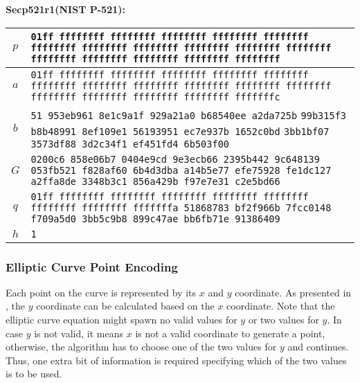 \textbf{Secp521r1(NIST P-521):}
\begin{center}
\begin{tabular}{|c|p{9.8cm}|} \hline
    $p$ &   \texttt{\phantom{0000}01ff ffffffff ffffffff ffffffff ffffffff ffffffff} \newline
            \texttt{ffffffff ffffffff ffffffff ffffffff ffffffff ffffffff} \newline
            \texttt{ffffffff ffffffff ffffffff ffffffff ffffffff} \\ \hline
    $a$ &   \texttt{\phantom{0000}01ff ffffffff ffffffff ffffffff ffffffff ffffffff} \newline
            \texttt{ffffffff ffffffff ffffffff ffffffff ffffffff ffffffff} \newline
            \texttt{ffffffff ffffffff ffffffff ffffffff fffffffc} \\ \hline
    $b$ &   \texttt{\phantom{000000}51 953eb961 8e1c9a1f 929a21a0 b68540ee a2da725b} \newline
            \texttt{99b315f3 b8b48991 8ef109e1 56193951 ec7e937b 1652c0bd} \newline
            \texttt{3bb1bf07 3573df88 3d2c34f1 ef451fd4 6b503f00} \\ \hline
    $G$ &   \texttt{\phantom{00}0200c6 858e06b7 0404e9cd 9e3ecb66 2395b442 9c648139} \newline
            \texttt{053fb521 f828af60 6b4d3dba a14b5e77 efe75928 fe1dc127} \newline
            \texttt{a2ffa8de 3348b3c1 856a429b f97e7e31 c2e5bd66} \\ \hline
    $q$ &   \texttt{\phantom{0000}01ff ffffffff ffffffff ffffffff ffffffff ffffffff} \newline
            \texttt{ffffffff ffffffff fffffffa 51868783 bf2f966b 7fcc0148} \newline
            \texttt{f709a5d0 3bb5c9b8 899c47ae bb6fb71e 91386409} \\ \hline
    $h$ &   \texttt{1} \\ \hline
\end{tabular}
\end{center}


\subsubsection{Elliptic Curve Point Encoding}
Each point on the curve is represented by its $x$ and $y$ coordinate. As presented in \cite{Trappe05}, the $y$ coordinate can be calculated based on the $x$ coordinate. Note that the elliptic curve equation might spawn no valid values for $y$ or two values for $y$. In case $y$ is not valid, it means $x$ is not a valid coordinate to generate a point, otherwise, the algorithm has to choose one of the two values for $y$ and continues. Thus, one extra bit of information is required specifying which of the two values is to be used.

